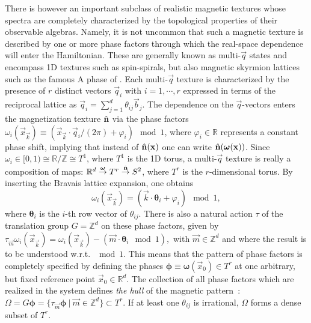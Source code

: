\documentclass[
    10pt,
    aps,
    prl,
    twocolumn,
    floatfix,
    superscriptaddress
]{revtex4-2}
\begin{document}
There is however an important subclass of realistic magnetic textures whose spectra are completely characterized by the topological properties of their observable algebras.
Namely, it is not uncommon that such a magnetic texture is described by one or more phase factors through which the real-space dependence will enter the Hamiltonian. 
These are generally known as multi-$\vec{q}$ states and encompass 1D textures such as spin-spirals, but also magnetic skyrmion lattices such as the famous A phase of .
Each multi-$\vec{q}$ texture is characterized by
the presence of $r$ distinct vectors $\vec{q}_i$ with $i=1,\cdots,r$ expressed in terms of the reciprocal lattice as $\vec{q}_i = \sum_{j=1}^d \theta_{ij} \vec{b}_j$.
The dependence on the $\vec{q}$-vectors enters the magnetization texture $\hat{\mathbf{n}}$ via the
phase factors 
$
    \omega_i (\vec{x}_\vec{k}) \equiv  (\vec{x}_\vec{k}  \cdot \vec{q}_i/ (2\pi) + \varphi_i) \mod 1 
$, where $\varphi_i \in \mathbb{R}$ represents a constant phase shift, implying that instead of $\hat{\mathbf{n}}(\mathbf{x})$  one can write $\hat{\mathbf{n}}( \boldsymbol{\omega} (\mathbf{x}) )$.
Since $\omega_i \in [0,1) \cong \mathbb{R}/ \mathbb{Z} \cong T^1$, where $T^1$ is the 1D torus, a multi-$\vec{q}$ texture is really a composition of maps: $\mathbb{R}^d \overset{\boldsymbol{\omega}}{\rightarrow} T^r
     \overset{\hat{\mathbf{n}}}{\rightarrow} S^2 $, where $T^r$ is the $r$-dimensional torus.
By inserting the Bravais lattice expansion, one obtains
\begin{equation}
    \omega_i (\vec{x}_\vec{k}) = \left(
      \vec{k} \cdot \boldsymbol{\theta}_i
     + \varphi_i
    \right) \mod 1,
\end{equation}
where $\boldsymbol{\theta}_i$ is the $i$-th row vector of $\theta_{ij}$.
There is also a natural action $\tau$ of the translation group $G=\mathbb{Z}^d$ on these phase factors, given by
$
    \tau_{\vec{m}}\omega_i (\vec{x}_\vec{k}) =\omega_i (\vec{x}_\vec{k} ) - ( \vec{m} \cdot \boldsymbol{\theta}_i \mod 1) ,
$
with $\vec{m}\in \mathbb{Z}^d$ and where the result is to be understood w.r.t. $\mod 1$.
This means that the pattern of phase factors is completely specified by defining the phases  $\boldsymbol{\phi} \equiv \boldsymbol{\omega}(\vec{x}_0) \in T^r$  at one arbitrary, but fixed reference point $\vec{x}_0 \in \mathbb{R}^d$.
The collection of all phase factors which are realized in the system defines {\it the hull} of the magnetic pattern~\cite{Bellissard2000}:
$
    \Omega = G\boldsymbol{\phi}= \lbrace \tau_{\vec{m}}\boldsymbol{\phi} ~|~ \vec{m} \in \mathbb{Z}^d \rbrace  \subset T^r 
$.
If at least one $\theta_{ij}$ is irrational, $\Omega$ forms a dense subset of $T^r$.
\end{document}
